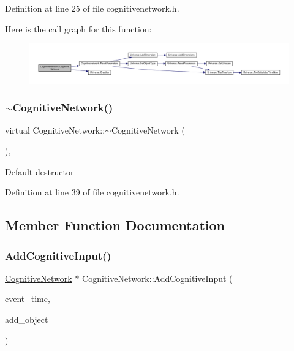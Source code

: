 Definition at line 25 of file cognitivenetwork.\+h.

Here is the call graph for this function\+:\nopagebreak
\begin{figure}[H]
\begin{center}
\leavevmode
\includegraphics[width=350pt]{class_cognitive_network_a6ec49dcc8cc58cded71983291629179c_cgraph}
\end{center}
\end{figure}
\mbox{\label{class_cognitive_network_a17142cc6f0bb3894e63f6c66fa401778}} 
\subsubsection{\texorpdfstring{$\sim$\+Cognitive\+Network()}{~CognitiveNetwork()}}
{\footnotesize\ttfamily virtual Cognitive\+Network\+::$\sim$\+Cognitive\+Network (\begin{DoxyParamCaption}{ }\end{DoxyParamCaption})\hspace{0.3cm}{\ttfamily [inline]}, {\ttfamily [virtual]}}

Default destructor 

Definition at line 39 of file cognitivenetwork.\+h.



\subsection{Member Function Documentation}
\mbox{\label{class_cognitive_network_a6af57693982286ac6a6831ca3010b760}} 
\subsubsection{\texorpdfstring{Add\+Cognitive\+Input()}{AddCognitiveInput()}}
{\footnotesize\ttfamily \mbox{\hyperlink{class_cognitive_network}{Cognitive\+Network}} $\ast$ Cognitive\+Network\+::\+Add\+Cognitive\+Input (\begin{DoxyParamCaption}\item[{std\+::chrono\+::time\+\_\+point$<$ \mbox{\hyperlink{universe_8h_a0ef8d951d1ca5ab3cfaf7ab4c7a6fd80}{Clock}} $>$}]{event\+\_\+time,  }\item[{\mbox{\hyperlink{class_cognitive_network}{Cognitive\+Network}} $\ast$}]{add\+\_\+object }\end{DoxyParamCaption})}




